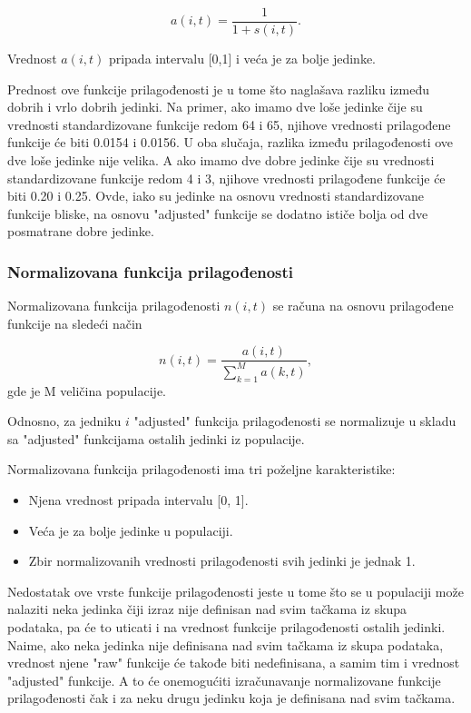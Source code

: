 \documentclass[main.tex]{subfiles}
\begin{document}
\[ a(i,t) = \frac{1}{1 + s(i,t)}. \]

Vrednost $a(i,t)$ pripada intervalu [0,1] i veća je za bolje jedinke.

Prednost ove funkcije prilagođenosti je u tome što naglašava razliku između dobrih i vrlo dobrih jedinki. Na primer, ako imamo dve loše jedinke čije su vrednosti standardizovane funkcije redom 64 i 65, njihove vrednosti prilagođene funkcije će biti 0.0154 i 0.0156. U oba slučaja, razlika između prilagođenosti ove dve loše jedinke nije velika. A ako imamo dve dobre jedinke čije su vrednosti standardizovane funkcije redom 4 i 3, njihove vrednosti prilagođene funkcije će biti 0.20 i 0.25. %
Ovde, iako su jedinke na osnovu vrednosti standardizovane funkcije bliske, na osnovu "adjusted" funkcije se dodatno ističe bolja od dve posmatrane dobre jedinke.

\subsubsection{Normalizovana funkcija prilagođenosti}
\label{sec:normalizedFitness}

Normalizovana funkcija prilagođenosti $n(i,t)$ se računa na osnovu prilagođene funkcije na sledeći način

\[ n(i,t) = \frac{a(i,t)}{\sum_{k=1}^{M}a(k,t)}, \]
gde je M veličina populacije.

Odnosno, za jedniku $i$ "adjusted" funkcija prilagođenosti se normalizuje u skladu sa "adjusted" funkcijama ostalih jedinki iz populacije.

Normalizovana funkcija prilagođenosti ima tri poželjne karakteristike:

\begin{itemize}
    \item Njena vrednost pripada intervalu [0, 1].
    \item Veća je za bolje jedinke u populaciji.
    \item Zbir normalizovanih vrednosti prilagođenosti svih jedinki je jednak 1.
\end{itemize}

Nedostatak ove vrste funkcije prilagođenosti jeste u tome što se u populaciji može nalaziti neka jedinka čiji izraz nije definisan nad svim tačkama iz skupa podataka, pa će to uticati i na vrednost funkcije prilagođenosti ostalih jedinki. Naime, ako neka jedinka nije definisana nad svim tačkama iz skupa podataka, vrednost njene "raw" funkcije će takođe biti nedefinisana, a samim tim i vrednost "adjusted" funkcije. A to će onemogućiti izračunavanje normalizovane funkcije prilagođenosti čak i za neku drugu jedinku koja je definisana nad svim tačkama. %
\end{document}
